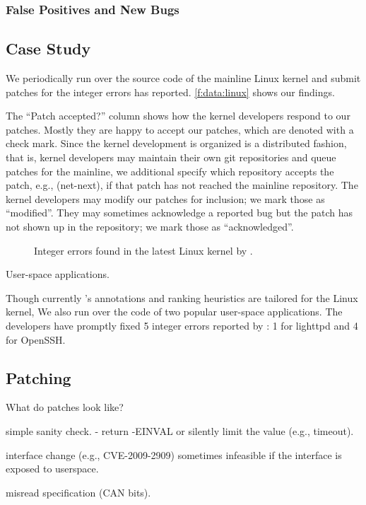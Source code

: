 \subsubsection{False Positives and New Bugs}


\subsection{Case Study}

We periodically run \sys over the source code of the mainline Linux
kernel and submit patches for the integer errors \sys has reported.
\autoref{f:data:linux} shows our findings.

The ``Patch accepted?'' column shows how the kernel developers
respond to our patches.  Mostly they are happy to accept our patches,
which are denoted with a check mark.  Since the kernel development
is organized is a distributed fashion, that is, kernel developers
may maintain their own git repositories and queue patches for the
mainline, we additional specify which repository accepts the
patch, e.g., (net-next), if that patch has not reached the mainline
repository.  The kernel developers may modify our patches for
inclusion; we mark those as ``modified''.  They may sometimes
acknowledge a reported bug but the patch has not shown up in the
repository; we mark those as ``acknowledged''.

\begin{figure*}
\centering
\footnotesize

\caption{Integer errors found in the latest Linux kernel by \sys.}
\label{f:data:linux}
\end{figure*}

User-space applications.

Though currently \sys's annotations and ranking heuristics are
tailored for the Linux kernel, We also run \sys over the code of
two popular user-space applications.  The developers have promptly
fixed 5 integer errors reported by \sys: 1 for lighttpd and 4 for
OpenSSH.

\subsection{Patching}

What do patches look like?

simple sanity check.
- return -EINVAL or silently limit the value (e.g., timeout).

interface change (e.g., CVE-2009-2909)
sometimes infeasible if the interface is exposed to userspace.

misread specification (CAN bits).
